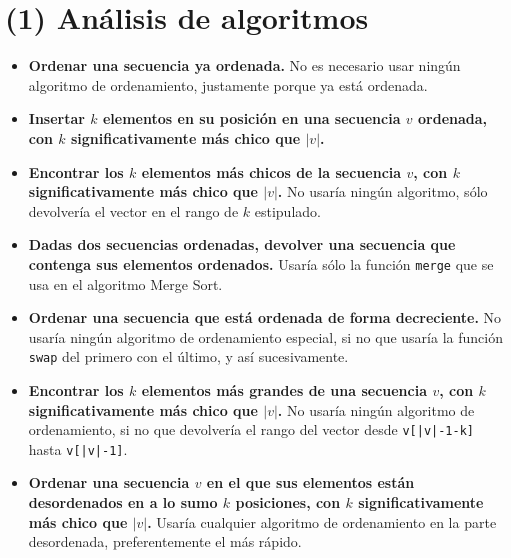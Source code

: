 \documentclass[12 pt]{article}
\begin{document}
\section*{(1) Análisis de algoritmos}
    \begin{itemize}
        \item \textbf{Ordenar una secuencia ya ordenada.} No es necesario usar ningún algoritmo de ordenamiento, justamente porque ya está ordenada.
        \item \textbf{Insertar $k$ elementos en su posición en una secuencia $v$ ordenada,
        con $k$ significativamente más chico que $|v|$.}
        \item \textbf{Encontrar los $k$ elementos más chicos de la secuencia $v$, con $k$
        significativamente más chico que $|v|$.} No usaría ningún algoritmo, sólo devolvería el vector en el rango de $k$ estipulado.
    \end{itemize}

    \begin{itemize}
        \item \textbf{Dadas dos secuencias ordenadas, devolver una secuencia que
        contenga sus elementos ordenados.} Usaría sólo la función \texttt{merge} que se usa en el algoritmo Merge Sort.
        \item \textbf{Ordenar una secuencia que está ordenada de forma decreciente.} No usaría ningún algoritmo de ordenamiento especial, si no que usaría la función \texttt{swap} del primero con el último, y así sucesivamente.
        \item \textbf{Encontrar los $k$ elementos más grandes de una secuencia $v$, con $k$
        significativamente más chico que $|v|$.} No usaría ningún algoritmo de ordenamiento, si no que devolvería el rango del vector desde \texttt{v[|v|-1-k]} hasta \texttt{v[|v|-1]}.
        \item \textbf{Ordenar una secuencia $v$ en el que sus elementos están desordenados en a lo sumo $k$ posiciones, con $k$ signiﬁcativamente más chico que $|v|$.} Usaría cualquier algoritmo de ordenamiento en la parte desordenada, preferentemente el más rápido.
    \end{itemize}
\end{document}

